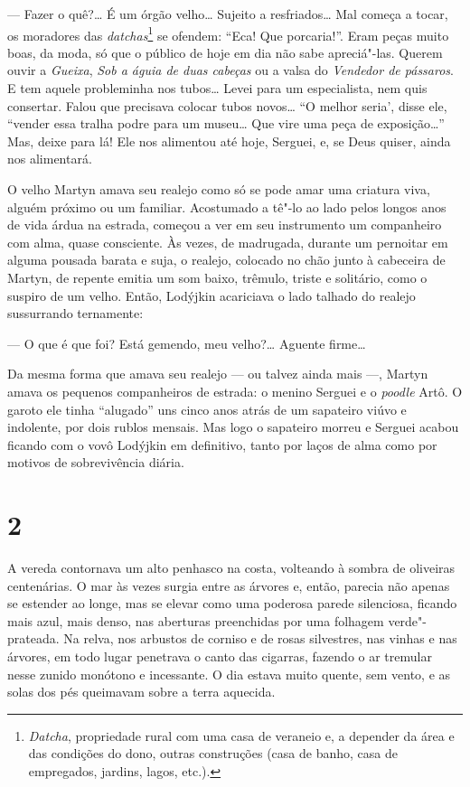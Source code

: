 --- Fazer o quê?\ldots{} É um órgão velho\ldots{} Sujeito a resfriados\ldots{} Mal
começa a tocar, os moradores das \emph{datchas}\footnote{\emph{Datcha},
  propriedade rural com uma casa de veraneio e, a depender da área e das
  condições do dono, outras construções (casa de banho, casa de
  empregados, jardins, lagos, etc.).} se ofendem: ``Eca! Que
porcaria!''. Eram peças muito boas, da moda, só que o público de hoje em
dia não sabe apreciá"-las. Querem ouvir a \emph{Gueixa}, \emph{Sob a
águia de duas cabeças} ou a valsa do \emph{Vendedor de pássaros}. E tem
aquele probleminha nos tubos\ldots{} Levei para um especialista, nem quis
consertar. Falou que precisava colocar tubos novos\ldots{} ``O melhor seria',
disse ele, ``vender essa tralha podre para um museu\ldots{} Que vire uma peça
de exposição\ldots{}'' Mas, deixe para lá! Ele nos alimentou até hoje,
Serguei, e, se Deus quiser, ainda nos alimentará.

O velho Martyn amava seu realejo como só se pode amar uma criatura viva,
alguém próximo ou um familiar. Acostumado a tê"-lo ao lado pelos longos
anos de vida árdua na estrada, começou a ver em seu instrumento um
companheiro com alma, quase consciente. Às vezes, de madrugada, durante
um pernoitar em alguma pousada barata e suja, o realejo, colocado no
chão junto à cabeceira de Martyn, de repente emitia um som baixo,
trêmulo, triste e solitário, como o suspiro de um velho. Então, Lodýjkin
acariciava o lado talhado do realejo sussurrando ternamente:

--- O que é que foi? Está gemendo, meu velho?\ldots{} Aguente firme\ldots{}

Da mesma forma que amava seu realejo --- ou talvez ainda mais ---,
Martyn amava os pequenos companheiros de estrada: o menino Serguei e o
\emph{poodle} Artô. O garoto ele tinha ``alugado'' uns cinco anos atrás
de um sapateiro viúvo e indolente, por dois rublos mensais. Mas logo o
sapateiro morreu e Serguei acabou ficando com o vovô Lodýjkin em
definitivo, tanto por laços de alma como por motivos de sobrevivência
diária.

\section{2}

A vereda contornava um alto penhasco na costa, volteando à sombra de
oliveiras centenárias. O mar às vezes surgia entre as árvores e, então,
parecia não apenas se estender ao longe, mas se elevar como uma poderosa
parede silenciosa, ficando mais azul, mais denso, nas aberturas
preenchidas por uma folhagem verde"-prateada. Na relva, nos arbustos de
corniso e de rosas silvestres, nas vinhas e nas árvores, em todo lugar
penetrava o canto das cigarras, fazendo o ar tremular nesse zunido
monótono e incessante. O dia estava muito quente, sem vento, e as solas
dos pés queimavam sobre a terra aquecida.

